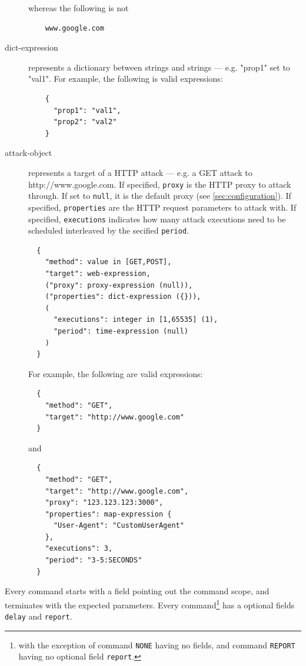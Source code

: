 \begin{description}
  whereas the following is not

  \begin{verbatim}
    www.google.com
  \end{verbatim}

  \item[dict-expression] represents a dictionary between strings and strings — e.g. "prop1" set to "val1".
  For example, the following is valid expressions:

  \begin{verbatim}
    {
      "prop1": "val1",
      "prop2": "val2"
    }
  \end{verbatim}

  \item[attack-object] represents a target of a HTTP attack — e.g. a GET attack to http://www.google.com.
  If specified, \texttt{proxy} is the HTTP proxy to attack through. If set to \texttt{null}, it is the default proxy (see \ref{sec:configuration}).
  If specified, \texttt{properties} are the HTTP request parameters to attack with.
  If specified, \texttt{executions} indicates how many attack executions need to be scheduled interleaved by the secified \texttt{period}.

  \begin{verbatim}
  {
    "method": value in [GET,POST],
    "target": web-expression,
    ("proxy": proxy-expression (null)),
    ("properties": dict-expression ({})),
    (
      "executions": integer in [1,65535] (1),
      "period": time-expression (null)
    )
  }
  \end{verbatim}

  For example, the following are valid expressions:

  \begin{verbatim}
  {
    "method": "GET",
    "target": "http://www.google.com"
  }
  \end{verbatim}

  and

  \begin{verbatim}
  {
    "method": "GET",
    "target": "http://www.google.com",
    "proxy": "123.123.123:3000",
    "properties": map-expression {
      "User-Agent": "CustomUserAgent"
    },
    "executions": 3,
    "period": "3-5:SECONDS"
  }
  \end{verbatim}

\end{description}

Every command starts with a field pointing out the command scope, and terminates with the expected parameters.
Every command\footnote{with the exception of command \texttt{NONE} having no fields, and command \texttt{REPORT} having no optional field \texttt{report}.}  has a optional fields \texttt{delay} and \texttt{report}.

